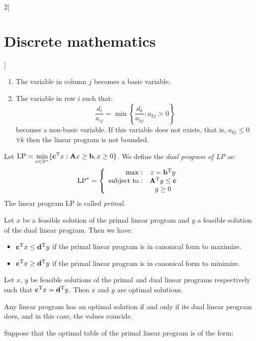 \documentclass[../../../main.tex]{subfiles}
\begin{document}
\begin{multicols}{2}[\section{Discrete mathematics}]
  \begin{enumerate}
    \item The variable in column $j$ becomes a basic variable.
    \item The variable in row $i$ such that: $$\frac{d_i}{a_{ij}}=\min\left\{\frac{d_k}{a_{kj}}:a_{kj}>0\right\}$$ becomes a non-basic variable. If this variable does not exists, that is, $a_{kj}\leq0$ $\forall k$ then the linear program is not bounded.
  \end{enumerate}
  \begin{definition}
    Let $\text{LP}=\displaystyle\min_{x\in\mathbb{R} ^n}\{\vb{c}^{\mathrm{T}}x:\boldsymbol{\mathrm{A}}x\geq \boldsymbol{\mathrm{b}},x\geq 0\}$. We define the \textit{dual program of LP} as: $$\text{LP}^*=\left\{
      \begin{array}{rc}
        \max:              & z=\vb{b}^{\mathrm{T}}y                      \\
        \text{subject to}: & \vb{A}^{\mathrm{T}}y\leq \boldsymbol{\mathrm{c}} \\
                           & y\geq 0
      \end{array}\right.$$ The linear program LP is called \textit{primal}.
  \end{definition}
  \begin{theorem}
    Let $x$ be a feasible solution of the primal linear program and $y$ a feasible solution of the dual linear program. Then we have:
    \begin{itemize}
      \item $\vb{c}^{\mathrm{T}}x\leq \vb{d}^{\mathrm{T}}y$ if the primal linear program is in canonical form to maximize.
      \item $\vb{c}^{\mathrm{T}}x\geq \vb{d}^{\mathrm{T}}y$ if the primal linear program is in canonical form to minimize.
    \end{itemize}
  \end{theorem}
  \begin{corollary}
    Let $x$, $y$ be feasible solutions of the primal and dual linear programs respectively such that $\vb{c}^{\mathrm{T}}x=\vb{d}^{\mathrm{T}}y$. Then $x$ and $y$ are optimal solutions.
  \end{corollary}
  \begin{theorem}
    Any linear program has an optimal solution if and only if its dual linear program does, and in this case, the values coincide.
  \end{theorem}
  \begin{theorem}
    Suppose that the optimal table of the primal linear program is of the form:

\end{theorem}
\end{multicols}
\end{document}
